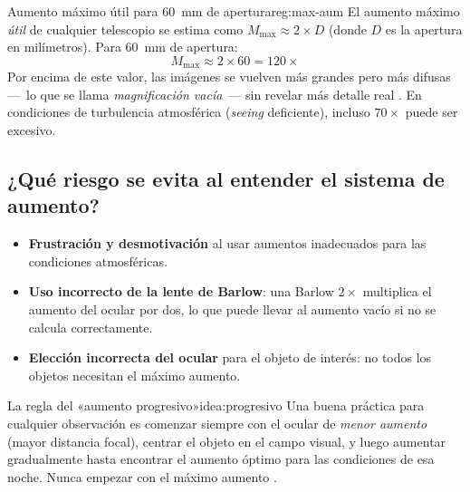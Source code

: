 \documentclass[12pt,oneside]{book}
\begin{document}
\begin{regla}{Aumento máximo útil para 60~mm de apertura}{reg:max-aum}
    El aumento máximo \emph{útil} de cualquier telescopio se estima como
    $M_{\max} \approx 2 \times D$ (donde $D$ es la apertura en milímetros).
    Para 60~mm de apertura:
    \[
        M_{\max} \approx 2 \times 60 = 120\times
    \]
    Por encima de este valor, las imágenes se vuelven más grandes pero más
    difusas —~lo que se llama \emph{magnificación vacía}~— sin revelar más
    detalle real \cite{suiter1994,rutten1988}. En condiciones de turbulencia
    atmosférica (\emph{seeing} deficiente), incluso $70\times$ puede ser
    excesivo.
\end{regla}

\subsection{¿Qué riesgo se evita al entender el sistema de aumento?}

\begin{itemize}[leftmargin=1.5em]
    \item \textbf{Frustración y desmotivación} al usar aumentos inadecuados para
          las condiciones atmosféricas.
    \item \textbf{Uso incorrecto de la lente de Barlow}: una Barlow $2\times$
          multiplica el aumento del ocular por dos, lo que puede llevar al aumento
          vacío si no se calcula correctamente.
    \item \textbf{Elección incorrecta del ocular} para el objeto de interés: no
          todos los objetos necesitan el máximo aumento.
\end{itemize}

\begin{idea}{La regla del «aumento progresivo»}{idea:progresivo}
    Una buena práctica para cualquier observación es comenzar siempre con el
    ocular de \emph{menor aumento} (mayor distancia focal), centrar el objeto
    en el campo visual, y luego aumentar gradualmente hasta encontrar el aumento
    óptimo para las condiciones de esa noche. Nunca empezar con el máximo aumento
    \cite{tonkin2007}.
\end{idea}
\end{document}
